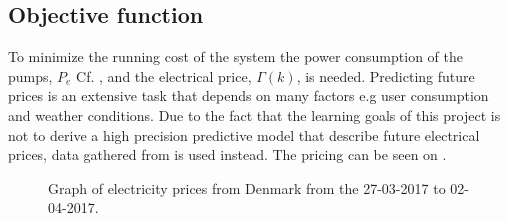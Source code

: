 \subsection{Objective function}\label{sec:cost_fkt} 
%
%
To minimize the running cost of the system the power consumption of the pumps, $P_e$ Cf. , and the electrical price, $\Gamma(k)$, is needed. Predicting future prices is an extensive task that depends on many factors e.g user consumption and weather conditions. Due to the fact that the learning goals of this project is not to derive a high precision predictive model that describe future electrical prices, data gathered from \cite{Electrical_price} is used instead. The pricing can be seen on . 





	


\begin{figure}[H]
\centering

\caption{Graph of electricity prices from Denmark from the 27-03-2017 to 02-04-2017.}
\label{fig:electrical_price} 
\end{figure}

